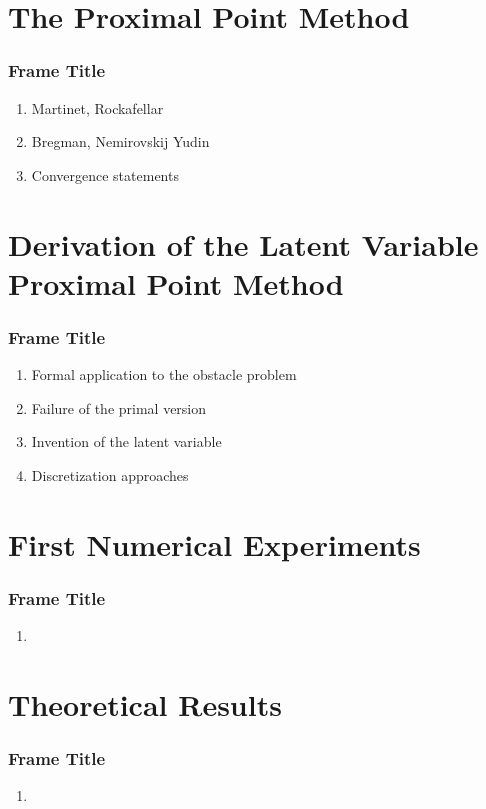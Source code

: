 \documentclass[aspectratio=169,xcolor=dvipsnames,11pt]{beamer}
\begin{document}
\section{The Proximal Point Method}
 \begin{frame}\frametitle{Frame Title}
    \begin{enumerate}
    	\item Martinet, Rockafellar
	\item Bregman, Nemirovskij Yudin
	\item Convergence statements
    \end{enumerate}
 \end{frame}

\section{Derivation of the Latent Variable Proximal Point Method}
 \begin{frame}\frametitle{Frame Title}
        \begin{enumerate}
    	\item Formal application to the obstacle problem
	\item Failure of the primal version
	\item Invention of the latent variable
	\item Discretization approaches
    \end{enumerate}
 \end{frame}
 
 
 \section{First Numerical Experiments}
 \begin{frame}\frametitle{Frame Title}
        \begin{enumerate}
    	\item
    \end{enumerate}
 \end{frame}
 
  \section{Theoretical Results}
 \begin{frame}\frametitle{Frame Title}
        \begin{enumerate}
    	\item
    \end{enumerate}
 \end{frame}
\end{document}
